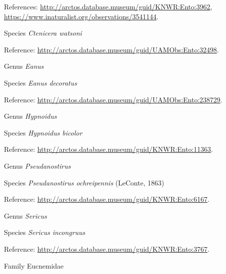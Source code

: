 \documentclass[9pt, article]{memoir}
\begin{document}
\begin{multicols}{2}
References: 
\url{http://arctos.database.museum/guid/KNWR:Ento:3962}, 
\url{https://www.inaturalist.org/observations/3541144}.

\vspace{6pt}\noindent\hspace{36pt}Species \textit{Ctenicera watsoni}


Reference: 
\url{http://arctos.database.museum/guid/UAMObs:Ento:32498}.

\vspace{6pt}\noindent\hspace{30pt}Genus \textit{Eanus}


\vspace{6pt}\noindent\hspace{36pt}Species \textit{Eanus decoratus}


Reference: 
\url{http://arctos.database.museum/guid/UAMObs:Ento:238729}.

\vspace{6pt}\noindent\hspace{30pt}Genus \textit{Hypnoidus}


\vspace{6pt}\noindent\hspace{36pt}Species \textit{Hypnoidus bicolor}


Reference: 
\url{http://arctos.database.museum/guid/KNWR:Ento:11363}.

\vspace{6pt}\noindent\hspace{30pt}Genus \textit{Pseudanostirus}


\vspace{6pt}\noindent\hspace{36pt}Species \textit{Pseudanostirus ochreipennis} (LeConte, 1863)


Reference: 
\url{http://arctos.database.museum/guid/KNWR:Ento:6167}.

\vspace{6pt}\noindent\hspace{30pt}Genus \textit{Sericus}


\vspace{6pt}\noindent\hspace{36pt}Species \textit{Sericus incongruus}


Reference: 
\url{http://arctos.database.museum/guid/KNWR:Ento:3767}.

\vspace{6pt}\noindent\hspace{24pt}Family Eucnemidae



\end{multicols}
\end{document}
